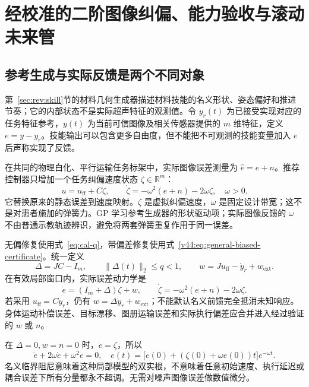 \documentclass[11pt,a4paper]{article}
\numberwithin{equation}{section}
\theoremstyle{definition}
\newcommand{\R}{\mathbb R}
\begin{document}
\section{经校准的二阶图像纠偏、能力验收与滚动未来管}
\label{sec:cal-recovery}

\subsection{参考生成与实际反馈是两个不同对象}

第~\ref{sec:rev:skill}节的材料几何生成器描述材料技能的名义形状、姿态偏好和推进节奏；它的内部状态不是实际超声特征的观测值。令 $y_r(t)$ 为已接受实现对应的任务特征参考，$y(t)$ 为当前可信图像及相关传感器提供的 $m$ 维特征，定义 $e=y-y_r$。技能输出可以包含更多自由度，但不能把不可观测的技能变量加入 $e$ 后声称实现了反馈。

在共同的物理白化、平行运输任务标架中，实际图像误差测量为 $\widehat e=e+n$。推荐控制器只增加一个任务纠偏速度状态 $\zeta\in\R^m$：
\begin{equation}
 \boxed{u=u_{\mathrm{ff}}+C\zeta,\qquad
 \dot\zeta=-\omega^2(e+n)-2\omega\zeta,\quad \omega>0.}
 \label{eq:cal-servo-second-order}
\end{equation}
它替换原来的静态误差到速度映射。$\zeta$ 是虚拟纠偏速度，$\omega$ 是固定设计带宽；这不是对患者施加的弹簧力。GP 学习参考生成器的形状驱动项；实际图像反馈的 $\omega$ 不由普通示教轨迹辨识，避免将两套弹簧重复作用于同一误差。

无偏修复使用式~\eqref{eq:cal-q}，带偏差修复使用式~\eqref{v44:eq:general-biased-certificate}。统一定义
\begin{equation}
 \Delta=JC-I_m,\qquad
 \|\Delta(t)\|_2\le q<1,
 \qquad
 w=Ju_{\mathrm{ff}}-\dot y_r+w_{\mathrm{ext}}.
 \label{eq:cal-feedback-residual}
\end{equation}
在有效局部窗口内，实际误差动力学是
\begin{equation}
 \boxed{\dot e=(I_m+\Delta)\zeta+w,\qquad
 \dot\zeta=-\omega^2(e+n)-2\omega\zeta.}
 \label{eq:cal-error-dynamics}
\end{equation}
若采用 $u_{\mathrm{ff}}=C\dot y_r$，仍有 $w=\Delta\dot y_r+w_{\mathrm{ext}}$；不能默认名义前馈完全抵消未知响应。身体运动补偿误差、目标漂移、图册运输误差和实际执行偏差应合并进入经过验证的 $w$ 或 $n$。

在 $\Delta=0,w=n=0$ 时，$\dot e=\zeta$，所以
\begin{equation}
 \ddot e+2\omega\dot e+\omega^2e=0,
 \quad
 e(t)=\bigl[e(0)+(\zeta(0)+\omega e(0))t\bigr]e^{-\omega t}.
 \label{eq:cal-nominal-second-order}
\end{equation}
名义临界阻尼意味着这种局部模型的双实根，不意味着任意初始速度、执行延迟或耦合误差下所有分量都永不超调。无需对噪声图像误差做数值微分。
\end{document}

